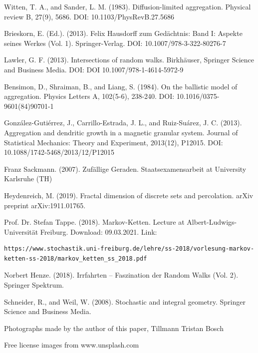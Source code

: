\documentclass[12pt,a4paper]{scrartcl}
\newcommand{\1}{\mathbbm{1}}
\theoremstyle{definition}
\numberwithin{equation}{section}
\begin{document}
\begin{thebibliography}{biblio}
\thispagestyle{empty}

Witten, T. A., and Sander, L. M. (1983). Diffusion-limited aggregation. Physical review B, 27(9), 5686. DOI: 10.1103/PhysRevB.27.5686

Brieskorn, E. (Ed.). (2013). Felix Hausdorff zum Gedächtnis: Band I: Aspekte seines Werkes (Vol. 1). Springer-Verlag. DOI: 10.1007/978-3-322-80276-7

Lawler, G. F. (2013). Intersections of random walks. Birkhäuser, Springer Science and Business Media. DOI: DOI 10.1007/978-1-4614-5972-9

Bensimon, D., Shraiman, B., and Liang, S. (1984). On the ballistic model of aggregation. Physics Letters A, 102(5-6), 238-240. DOI: 10.1016/0375-9601(84)90701-1

González-Gutiérrez, J., Carrillo-Estrada, J. L., and Ruiz-Suárez, J. C. (2013). Aggregation and dendritic growth in a magnetic granular system. Journal of Statistical Mechanics: Theory and Experiment, 2013(12), P12015. DOI: 10.1088/1742-5468/2013/12/P12015

Franz Sackmann. (2007). Zufällige Geraden. Staatsexamensarbeit at University Karlsruhe (TH)

Heydenreich, M. (2019). Fractal dimension of discrete sets and percolation. arXiv preprint arXiv:1911.01765.

Prof. Dr. Stefan Tappe. (2018). Markov-Ketten. Lecture at Albert-Ludwigs-Universität Freiburg. Download: 09.03.2021. Link: 
\begin{Verbatim}[fontsize=\tiny]
https://www.stochastik.uni-freiburg.de/lehre/ss-2018/vorlesung-markov-ketten-ss-2018/markov_ketten_ss_2018.pdf
\end{Verbatim}

Norbert Henze. (2018). Irrfahrten – Faszination der Random Walks (Vol. 2). Springer Spektrum. 

Schneider, R., and Weil, W. (2008). Stochastic and integral geometry. Springer Science and Business Media.

Photographs made by the author of this paper, Tillmann Tristan Bosch

Free license images from www.unsplash.com

\end{thebibliography}
\end{document}
